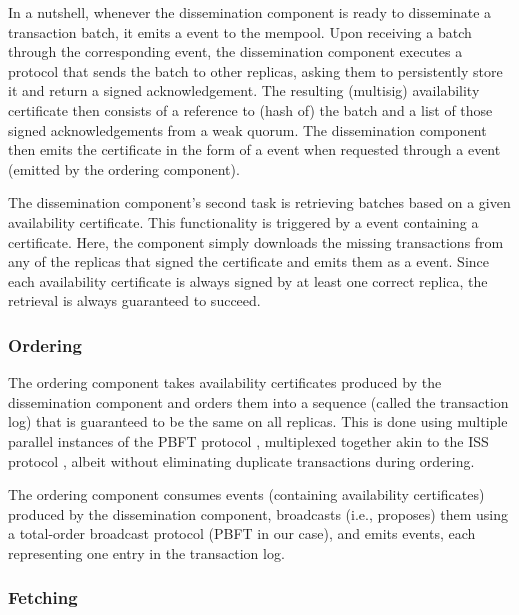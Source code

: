 \documentclass{article}
\begin{document}
In a nutshell, whenever the dissemination component is ready to disseminate a transaction batch,
it emits a  event to the mempool.
Upon receiving a batch through the corresponding  event,
the dissemination component executes a protocol that sends the batch to other replicas,
asking them to persistently store it and return a signed acknowledgement.
The resulting (multisig) availability certificate then consists of a reference to (hash of) the batch
and a list of those signed acknowledgements from a weak quorum.
The dissemination component then emits the certificate in the form of a  event
when requested through a  event (emitted by the ordering component).

The dissemination component’s second task is retrieving batches based on a given availability certificate.
This functionality is triggered by a  event containing a certificate.
Here, the component simply downloads the missing transactions from any of the replicas
that signed the certificate and emits them as a  event.
Since each availability certificate is always signed by at least one correct replica, the retrieval is always guaranteed to succeed.

\subsubsection{Ordering}

The ordering component takes availability certificates produced by the dissemination component
and orders them into a sequence (called the transaction log) that is guaranteed to be the same on all replicas.
This is done using multiple parallel instances of the PBFT protocol \cite{pbft},
multiplexed together akin to the ISS protocol \cite{iss}, albeit without eliminating duplicate transactions during ordering. 

The ordering component consumes  events
(containing availability certificates) produced by the dissemination component,
broadcasts (i.e., proposes) them using a total-order broadcast protocol (PBFT in our case),
and emits  events, each representing one entry in the transaction log.

\subsubsection{Fetching}
\label{sec:fetching}
\end{document}
